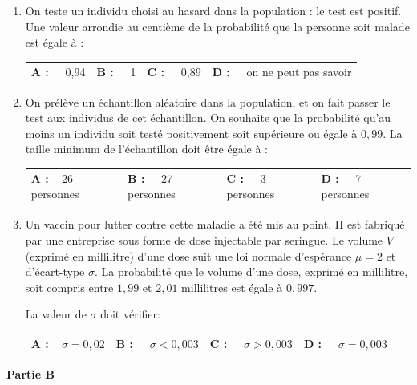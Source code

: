 \documentclass[10pt,a4paper]{article}
\begin{document}
\begin{enumerate}
\item On teste un individu choisi au hasard dans la population : le test est positif. Une valeur arrondie au centième de la probabilité que la personne soit malade est égale à :

\medskip
\begin{tabularx}{\linewidth}{*{4}{X}}
\textbf{A :~~} 0,94 &\textbf{B :~~} 1 &\textbf{C :~~} 0,89 &\textbf{D :~~} on ne peut pas savoir
\end{tabularx}
\medskip

\item  On prélève un échantillon aléatoire dans la population, et on fait passer le test aux individus de cet échantillon. On souhaite que la probabilité qu'au moins un individu soit testé positivement soit supérieure ou égale à $0,99$. La taille minimum de l'échantillon doit être égale à :

\medskip
\begin{tabularx}{\linewidth}{*{4}{X}}
\textbf{A :~~}26 personnes &\textbf{B :~~} 27 personnes &\textbf{C :~~} 3 personnes &\textbf{D :~~} 7 personnes
\end{tabularx}
\medskip

\item  Un vaccin pour lutter contre cette maladie a été mis au point. II est fabriqué par une entreprise sous forme de dose injectable par seringue. Le volume $V$ (exprimé en millilitre) d'une dose suit une loi normale d'espérance $\mu = 2$ et d'écart-type $\sigma$. La probabilité que le volume d'une dose, exprimé en millilitre, soit compris entre $1,99$ et $2,01$ millilitres est égale à $0,997$.

La valeur de $\sigma$ doit vérifier:

\medskip
\begin{tabularx}{\linewidth}{*{4}{X}}
\textbf{A :~~}$\sigma = 0,02$ &\textbf{B :~~} $\sigma < 0,003$ &\textbf{C :~~} $\sigma > 0,003$ &\textbf{D :~~} $\sigma = 0,003$
\end{tabularx}
\medskip
\end{enumerate}

\bigskip

\textbf{Partie B}

\medskip
\end{document}
